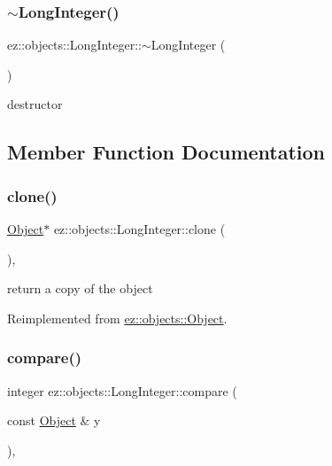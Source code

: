 \subsubsection{\texorpdfstring{$\sim$\+Long\+Integer()}{~LongInteger()}}
{\footnotesize\ttfamily ez\+::objects\+::\+Long\+Integer\+::$\sim$\+Long\+Integer (\begin{DoxyParamCaption}{ }\end{DoxyParamCaption})\hspace{0.3cm}{\ttfamily [inline]}}

destructor 

\subsection{Member Function Documentation}
\mbox{\label{classez_1_1objects_1_1LongInteger_af19a10913ba906a81cdb164897edade6}} 
\subsubsection{\texorpdfstring{clone()}{clone()}}
{\footnotesize\ttfamily \hyperlink{classez_1_1objects_1_1Object}{Object}$\ast$ ez\+::objects\+::\+Long\+Integer\+::clone (\begin{DoxyParamCaption}{ }\end{DoxyParamCaption})\hspace{0.3cm}{\ttfamily [inline]}, {\ttfamily [virtual]}}

return a copy of the object 

Reimplemented from \hyperlink{classez_1_1objects_1_1Object_acf444b2581d898eb4b8c92c2d5865c9e}{ez\+::objects\+::\+Object}.

\mbox{\label{classez_1_1objects_1_1LongInteger_ac2771a597b5f2ed611d9eb10f4339019}} 
\subsubsection{\texorpdfstring{compare()}{compare()}}
{\footnotesize\ttfamily integer ez\+::objects\+::\+Long\+Integer\+::compare (\begin{DoxyParamCaption}\item[{const \hyperlink{classez_1_1objects_1_1Object}{Object} \&}]{y }\end{DoxyParamCaption})\hspace{0.3cm}{\ttfamily [inline]}, {\ttfamily [virtual]}}

